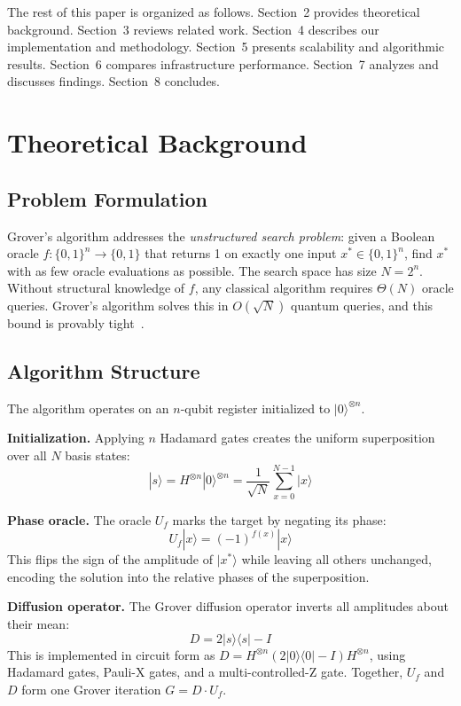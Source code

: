 \documentclass[sigconf, authorversion=true, nonacm=true]{acmart}
\begin{document}
The rest of this paper is organized as follows. Section~2 provides theoretical background. Section~3 reviews related work. Section~4 describes our implementation and methodology. Section~5 presents scalability and algorithmic results. Section~6 compares infrastructure performance. Section~7 analyzes and discusses findings. Section~8 concludes.

\section{Theoretical Background}

\subsection{Problem Formulation}

Grover's algorithm addresses the \emph{unstructured search problem}: given a Boolean oracle $f : \{0,1\}^n \to \{0,1\}$ that returns 1 on exactly one input $x^* \in \{0,1\}^n$, find $x^*$ with as few oracle evaluations as possible. The search space has size $N = 2^n$. Without structural knowledge of $f$, any classical algorithm requires $\Theta(N)$ oracle queries. Grover's algorithm solves this in $O(\sqrt{N})$ quantum queries, and this bound is provably tight~\cite{Bennett1997}.

\subsection{Algorithm Structure}

The algorithm operates on an $n$-qubit register initialized to $|0\rangle^{\otimes n}$.

\textbf{Initialization.} Applying $n$ Hadamard gates creates the uniform superposition over all $N$ basis states:
\[
|s\rangle = H^{\otimes n}|0\rangle^{\otimes n} = \frac{1}{\sqrt{N}} \sum_{x=0}^{N-1} |x\rangle
\]

\textbf{Phase oracle.} The oracle $U_f$ marks the target by negating its phase:
\[
U_f|x\rangle = (-1)^{f(x)}|x\rangle
\]
This flips the sign of the amplitude of $|x^*\rangle$ while leaving all others unchanged, encoding the solution into the relative phases of the superposition.

\textbf{Diffusion operator.} The Grover diffusion operator inverts all amplitudes about their mean:
\[
D = 2|s\rangle\langle s| - I
\]
This is implemented in circuit form as $D = H^{\otimes n}(2|0\rangle\langle 0| - I)H^{\otimes n}$, using Hadamard gates, Pauli-X gates, and a multi-controlled-Z gate. Together, $U_f$ and $D$ form one Grover iteration $G = D \cdot U_f$.
\end{document}
